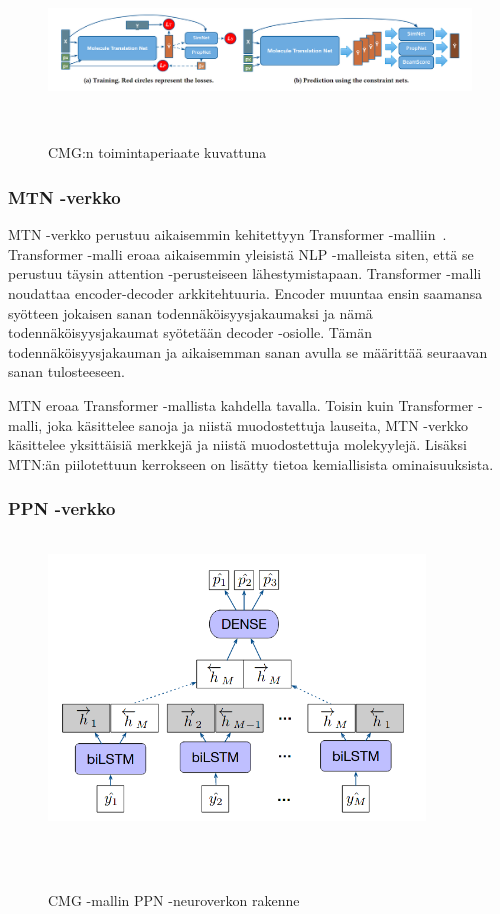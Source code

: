 \documentclass[finnish,twoside,censored,tkt,sw-line]{HYthesisML}
\begin{document}
\begin{figure}[!ht]
    \centering
    \includegraphics[width=\textwidth]{CMG-fig.png}
    \caption{CMG:n toimintaperiaate kuvattuna}
    {~\cite{ShinBonggun}}
    \label{fig:cmg-model-whole}
\end{figure}

\subsubsection{MTN -verkko}

MTN -verkko perustuu aikaisemmin kehitettyyn Transformer -malliin~\cite{TheTransformer}.
Transformer -malli eroaa aikaisemmin yleisistä NLP -malleista siten, että se perustuu täysin attention -perusteiseen lähestymistapaan.
Transformer -malli noudattaa encoder-decoder arkkitehtuuria.
Encoder muuntaa ensin saamansa syötteen jokaisen sanan todennäköisyysjakaumaksi ja nämä todennäköisyysjakaumat syötetään decoder -osiolle.
Tämän todennäköisyysjakauman ja aikaisemman sanan avulla se määrittää seuraavan sanan tulosteeseen.

MTN eroaa Transformer -mallista kahdella tavalla.
Toisin kuin Transformer -malli, joka käsittelee sanoja ja niistä muodostettuja lauseita, MTN -verkko käsittelee yksittäisiä merkkejä ja niistä muodostettuja molekyylejä.
Lisäksi MTN:än piilotettuun kerrokseen on lisätty tietoa kemiallisista ominaisuuksista.

\subsubsection{PPN -verkko}

\begin{figure}[!ht]
    \centering
    \includegraphics[width=10cm, height=8cm]{cmg-property-prediction-network.png}
    \caption{CMG -mallin PPN -neuroverkon rakenne}
    {~\cite{ShinBonggun}}
    \label{fig:cmg-model-ppn}
\end{figure}
\end{document}
